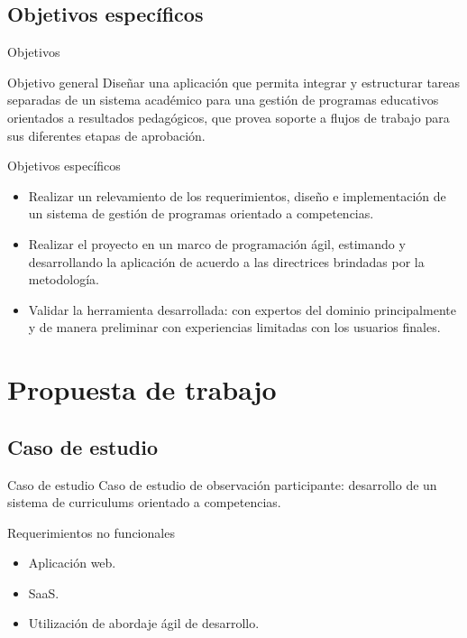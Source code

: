 \documentclass[10pt,xcolor=table ]{beamer}
\begin{document}
\subsection{Objetivos específicos}
\begin{frame}[t]{Objetivos}
	\begin{alertblock}{Objetivo general}
        Diseñar una aplicación que permita integrar y estructurar tareas separadas de un sistema académico para una gestión de programas educativos orientados a resultados pedagógicos, que provea soporte a flujos de trabajo para sus diferentes etapas de aprobación.
      \end{alertblock}

	\begin{alertblock}{Objetivos específicos}
        \begin{itemize}
        	\item Realizar un relevamiento de los requerimientos, diseño e implementación de un sistema de gestión de programas orientado a competencias.
        	\item Realizar el proyecto en un marco de programación ágil, estimando y desarrollando la aplicación de acuerdo a las directrices brindadas por la metodología.
        	\item Validar la herramienta desarrollada: con expertos del dominio principalmente y de manera preliminar con experiencias limitadas con los usuarios finales.
        \end{itemize}
    \end{alertblock}
\end{frame}

\section{Propuesta de trabajo}
\subsection{Caso de estudio}
\begin{frame}{Caso de estudio}
  	Caso de estudio de observación participante: desarrollo de un sistema de curriculums orientado a competencias.

	\begin{block}{Requerimientos no funcionales}
		\begin{itemize}
        	\item Aplicación web.
			\item SaaS.
			\item Utilización de abordaje ágil de desarrollo.
    	\end{itemize}
	\end{block}

\end{frame}
\end{document}
